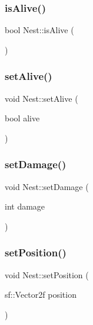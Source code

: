\mbox{\label{class_nest_a3f0d0175e349409ef2cab7e9bae0fb81}} 
\subsubsection{\texorpdfstring{is\+Alive()}{isAlive()}}
{\footnotesize\ttfamily bool Nest\+::is\+Alive (\begin{DoxyParamCaption}{ }\end{DoxyParamCaption})}

\mbox{\label{class_nest_a122840333f4f0d0f5acd2815b0f633ca}} 
\subsubsection{\texorpdfstring{set\+Alive()}{setAlive()}}
{\footnotesize\ttfamily void Nest\+::set\+Alive (\begin{DoxyParamCaption}\item[{bool}]{alive }\end{DoxyParamCaption})}

\mbox{\label{class_nest_a2a5904049fbb094af9f79ec55a5be9d6}} 
\subsubsection{\texorpdfstring{set\+Damage()}{setDamage()}}
{\footnotesize\ttfamily void Nest\+::set\+Damage (\begin{DoxyParamCaption}\item[{int}]{damage }\end{DoxyParamCaption})}

\mbox{\label{class_nest_a483c559f957838c28d613fddad8b99f3}} 
\subsubsection{\texorpdfstring{set\+Position()}{setPosition()}}
{\footnotesize\ttfamily void Nest\+::set\+Position (\begin{DoxyParamCaption}\item[{sf\+::\+Vector2f}]{position }\end{DoxyParamCaption})}

